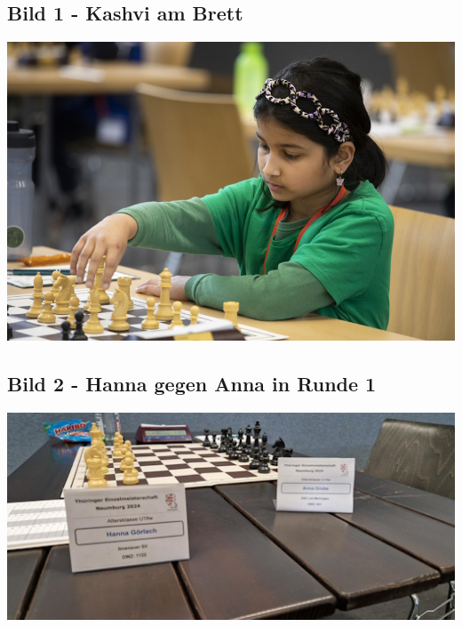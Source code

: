 \subsection{Bild 1 - Kashvi am Brett}
\begin{center}
    \includegraphics[width=\linewidth,height=0.5625\linewidth,keepaspectratio]{THJEM2.jpg}
    \label{fig:Kashvi Bild}
\end{center}

\subsection{Bild 2 - Hanna gegen Anna in Runde 1}
\begin{center}
    \includegraphics[width=0.8\linewidth,height=0.45\linewidth,keepaspectratio]{THJEM1.jpeg}
    \label{fig:THJEM Hanna Schild}
\end{center}

